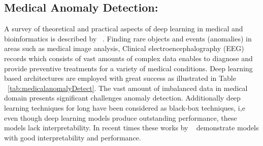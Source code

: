 \subsection{Medical Anomaly Detection:}
\label{sec:medical_anomaly_detection}

 A survey of theoretical and practical aspects of deep learning in medical and bioinformatics is described by ~\cite{min2017deep,cao2018deep,zhao2016deep,khan2018review}. Finding rare objects and events (anomalies) in areas such as medical image analysis, Clinical electroencephalography (EEG) records which consists of vast amounts of complex data enables to diagnose and provide preventive treatments for a variety of medical conditions. Deep learning based architectures are employed with great success as illustrated in Table ~\ref{tab:medicalanomalyDetect}. The vast amount of imbalanced data in medical domain presents significant challenges anomaly detection. Additionally deep learning techniques for long have been considered as black-box techniques, i,e even though deep learning models produce outstanding performance, these models lack interpretability. In recent times these works by ~\cite{gugulothusparse,amarasinghe2018toward,choi2018doctor} demonstrate models with good interpretability and performance.
